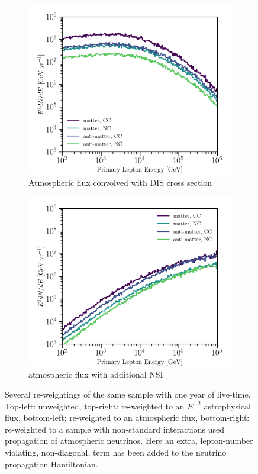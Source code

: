 \documentclass[main.tex]{subfiles}
\begin{document}
\begin{figure}[h]
\begin{subfigure}[b]{0.45\linewidth}
    \end{subfigure}\\
    \begin{subfigure}[b]{0.45\linewidth}
    	\centering
        \includegraphics[width=1.0\linewidth]{figures/totalE_weighted_atmo.png}
        \caption{Atmospheric flux convolved with DIS cross section}
    \end{subfigure}%
    \begin{subfigure}[b]{0.45\linewidth}
    	\centering
        \includegraphics[width=1.0\linewidth]{figures/totalE_weighted_bsm.png}
        \caption{atmospheric flux with additional NSI}
    \end{subfigure}
    \caption{Several re-weightings of the same sample with one year of live-time. Top-left: unweighted, top-right: re-weighted to an $E^{-2}$ astrophysical flux, bottom-left: re-weighted to an atmospheric flux, bottom-right: re-weighted to a sample with non-standard interactions used propagation of atmospheric neutrinos. Here an extra, lepton-number violating, non-diagonal, term has been added to the neutrino propagation Hamiltonian.}\label{fig:weightings}
\end{figure}
\end{document}
